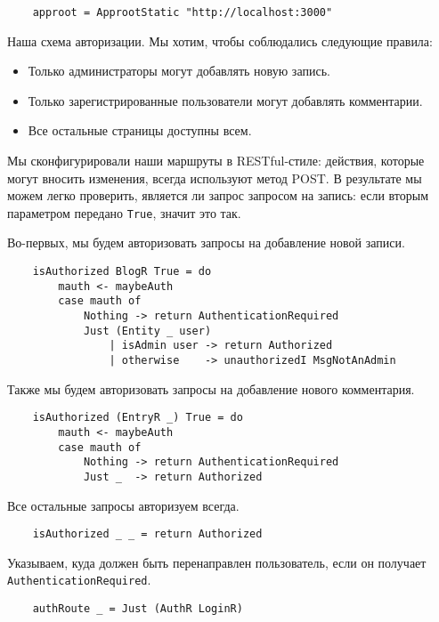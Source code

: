 \begin{lstlisting}
    approot = ApprootStatic "http://localhost:3000"
\end{lstlisting}
 
Наша схема авторизации. Мы хотим, чтобы соблюдались следующие правила:

\begin{itemize}
\item Только администраторы могут добавлять новую запись. 
\item Только зарегистрированные пользователи могут добавлять комментарии. 
\item Все остальные страницы доступны всем.
\end{itemize}

Мы сконфигурировали наши маршруты в RESTful-стиле: действия, которые могут вносить изменения, всегда используют метод POST. В результате мы можем легко проверить, является ли запрос запросом на запись: если вторым параметром передано \lstinline!True!, значит это так.

Во-первых, мы будем авторизовать запросы на добавление новой записи. 
 
\begin{lstlisting}
    isAuthorized BlogR True = do
        mauth <- maybeAuth
        case mauth of
            Nothing -> return AuthenticationRequired
            Just (Entity _ user)
                | isAdmin user -> return Authorized
                | otherwise    -> unauthorizedI MsgNotAnAdmin
\end{lstlisting}

Также мы будем авторизовать запросы на добавление нового комментария. 
 
\begin{lstlisting}
    isAuthorized (EntryR _) True = do
        mauth <- maybeAuth
        case mauth of
            Nothing -> return AuthenticationRequired
            Just _  -> return Authorized
\end{lstlisting}
 
Все остальные запросы авторизуем всегда.
 
\begin{lstlisting}
    isAuthorized _ _ = return Authorized
\end{lstlisting}
 
Указываем, куда должен быть перенаправлен пользователь, если он получает \lstinline!AuthenticationRequired!. 
 
\begin{lstlisting}
    authRoute _ = Just (AuthR LoginR)
\end{lstlisting}
 
